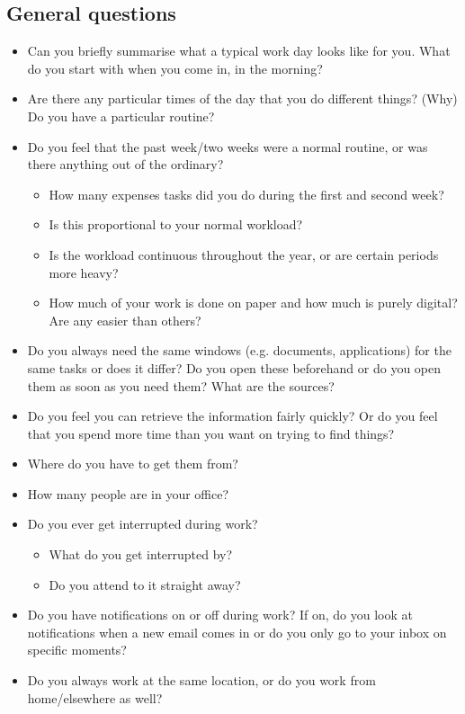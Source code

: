 \subsection{General questions}
\begin{itemize}
\item Can you briefly summarise what a typical work day looks like for you. What do you start with when you come in, in the morning?
\item Are there any particular times of the day that you do different things? (Why) Do you have a particular routine?
\item Do you feel that the past week/two weeks were a normal routine, or was there anything out of the ordinary?
\begin{itemize}
\item How many expenses tasks did you do during the first and second week?
\item Is this proportional to your normal workload? 
\item Is the workload continuous throughout the year, or are certain periods more heavy?
\item How much of your work is done on paper and how much is purely digital? Are any easier than others?
\end{itemize}
\item Do you always need the same windows (e.g. documents, applications) for the same tasks or does it differ? Do you open these beforehand or do you open them as soon as you need them? What are the sources?
\item Do you feel you can retrieve the information fairly quickly? Or do you feel that you spend more time than you want on trying to find things?
\item Where do you have to get them from? 
\item How many people are in your office?
\item Do you ever get interrupted during work?
\begin{itemize}
\item What do you get interrupted by?
\item Do you attend to it straight away?
\end{itemize}
\item Do you have notifications on or off during work? If on, do you look at notifications when a new email comes in or do you only go to your inbox on specific moments?
\item Do you always work at the same location, or do you work from home/elsewhere as well?

\end{itemize}
